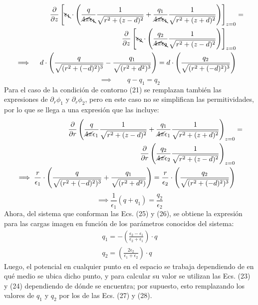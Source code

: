 \documentclass[12pt, notitlepage]{article}
\begin{document}
\begin{align*}
\frac{\partial}{\partial z}\left[\bcancel{\epsilon_1}\cdot\left(\frac{q}{\cancel{4\pi}\bcancel{\epsilon_1}}\frac{1}{\sqrt{r^2+(z-d)^2}}+\frac{q_1}{\cancel{4\pi}\bcancel{\epsilon_1}}\frac{1}{\sqrt{r^2 + (z+d)^2}}\right)\right]_{z = 0} &=\\ \frac{\partial}{\partial z}\left[\bcancel{\epsilon_2}\cdot\left(\frac{q_2}{\cancel{4\pi}\bcancel{\epsilon_2}}\frac{1}{\sqrt{r^2 + (z-d)^2}}\right)\right]_{z=0}&\\
\implies\quad d\cdot\left(\frac{q}{\sqrt{(r^2 + (-d)^2)^3}} - \frac{q_1}{\sqrt{(r^2 + d^2)^3}}\right) = d\cdot\left(\frac{q_2}{\sqrt{(r^2 + (-d)^2)^3}}\right)
\end{align*}
\begin{equation}
\implies \qquad q - q_1 = q_2
\end{equation}
Para el caso de la condición de contorno (21) se remplazan también las expresiones de $\partial_r\phi_1$ y $\partial_r\phi_2$, pero en este caso no se simplifican las permitividades, por lo que se llega a una expresión que las incluye:
\begin{align*}
\frac{\partial}{\partial r}\left(\frac{q}{\cancel{4\pi}\epsilon_1}\frac{1}{\sqrt{r^2 + (z-d)^2}} + \frac{q_1}{\cancel{4\pi}\epsilon_1}\frac{1}{\sqrt{r^2 + (z+d)^2}}\right)_{z=0}& =\\
\frac{\partial}{\partial r}\left(\frac{q_2}{\cancel{4\pi}\epsilon_2}\frac{1}{\sqrt{r^2 + (z-d)^2}}\right)_{z=0}&\\
\implies \frac{r}{\epsilon_1}\cdot\left(\frac{q}{\sqrt{(r^2 + (-d)^2)^3}}+ \frac{q_1}{\sqrt{(r^2 + d^2)}}\right) = \frac{r}{\epsilon_2}\cdot\left(\frac{q_2}{\sqrt{(r^2 + (-d)^2)^3}}\right)&
\end{align*}
\begin{equation}
\implies \frac{1}{\epsilon_1}(q + q_1) = \frac{q_2}{\epsilon_2}
\end{equation}
Ahora, del sistema que conforman las Ecs. (25) y (26), se obtiene la expresión para las cargas imagen en función de los parámetros conocidos del sistema:
\begin{gather}
q_1 = -\left(\frac{\epsilon_2 - \epsilon_1}{\epsilon_2 + \epsilon_1}\right)\cdot q\\
q_2 = \left(\frac{2\epsilon_2}{\epsilon_1 + \epsilon_2}\right)\cdot q
\end{gather}
Luego, el potencial en cualquier punto en el espacio se trabaja dependiendo de en qué medio se ubica dicho punto, y para calcular su valor se utilizan las Ecs. (23) y (24) dependiendo de dónde se encuentra; por supuesto, esto remplazando los valores de $q_1$ y $q_2$ por los de las Ecs. (27) y (28).
\end{document}
